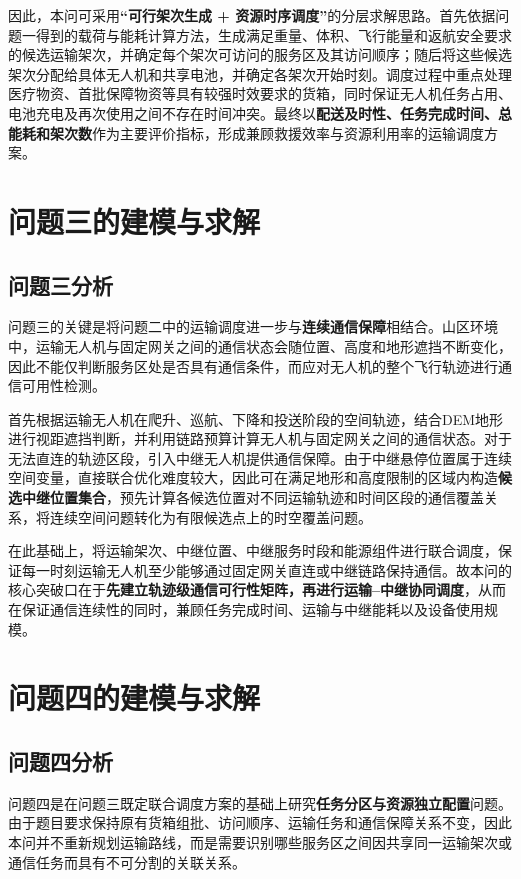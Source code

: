 \documentclass[bwprint,fontset=fandol]{gmcmthesis}
\begin{document}
因此，本问可采用\textbf{“可行架次生成 + 资源时序调度”}的分层求解思路。首先依据问题一得到的载荷与能耗计算方法，生成满足重量、体积、飞行能量和返航安全要求的候选运输架次，并确定每个架次可访问的服务区及其访问顺序；随后将这些候选架次分配给具体无人机和共享电池，并确定各架次开始时刻。调度过程中重点处理医疗物资、首批保障物资等具有较强时效要求的货箱，同时保证无人机任务占用、电池充电及再次使用之间不存在时间冲突。最终以\textbf{配送及时性、任务完成时间、总能耗和架次数}作为主要评价指标，形成兼顾救援效率与资源利用率的运输调度方案。


\section{问题三的建模与求解}
\subsection{问题三分析}
问题三的关键是将问题二中的运输调度进一步与\textbf{连续通信保障}相结合。山区环境中，运输无人机与固定网关之间的通信状态会随位置、高度和地形遮挡不断变化，因此不能仅判断服务区处是否具有通信条件，而应对无人机的整个飞行轨迹进行通信可用性检测。

首先根据运输无人机在爬升、巡航、下降和投送阶段的空间轨迹，结合DEM地形进行视距遮挡判断，并利用链路预算计算无人机与固定网关之间的通信状态。对于无法直连的轨迹区段，引入中继无人机提供通信保障。由于中继悬停位置属于连续空间变量，直接联合优化难度较大，因此可在满足地形和高度限制的区域内构造\textbf{候选中继位置集合}，预先计算各候选位置对不同运输轨迹和时间区段的通信覆盖关系，将连续空间问题转化为有限候选点上的时空覆盖问题。

在此基础上，将运输架次、中继位置、中继服务时段和能源组件进行联合调度，保证每一时刻运输无人机至少能够通过固定网关直连或中继链路保持通信。故本问的核心突破口在于\textbf{先建立轨迹级通信可行性矩阵，再进行运输--中继协同调度}，从而在保证通信连续性的同时，兼顾任务完成时间、运输与中继能耗以及设备使用规模。

\section{问题四的建模与求解}
\subsection{问题四分析}
问题四是在问题三既定联合调度方案的基础上研究\textbf{任务分区与资源独立配置}问题。由于题目要求保持原有货箱组批、访问顺序、运输任务和通信保障关系不变，因此本问并不重新规划运输路线，而是需要识别哪些服务区之间因共享同一运输架次或通信任务而具有不可分割的关联关系。
\end{document}
